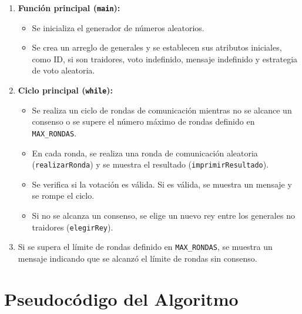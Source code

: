\documentclass[a4paper,12pt]{article}
\begin{document}
\begin{enumerate}
  \item \textbf{Función principal (\texttt{main}):}
  \begin{itemize}
      \item Se inicializa el generador de números aleatorios.
      \item Se crea un arreglo de generales y se establecen sus atributos iniciales, como ID, si son traidores, voto indefinido, mensaje indefinido y estrategia de voto aleatoria.
  \end{itemize}
  
  \item \textbf{Ciclo principal (\texttt{while}):}
  \begin{itemize}
      \item Se realiza un ciclo de rondas de comunicación mientras no se alcance un consenso o se supere el número máximo de rondas definido en \texttt{MAX\_RONDAS}.
      \item En cada ronda, se realiza una ronda de comunicación aleatoria (\texttt{realizarRonda}) y se muestra el resultado (\texttt{imprimirResultado}).
      \item Se verifica si la votación es válida. Si es válida, se muestra un mensaje y se rompe el ciclo.
      \item Si no se alcanza un consenso, se elige un nuevo rey entre los generales no traidores (\texttt{elegirRey}).
  \end{itemize}
  
  \item Si se supera el límite de rondas definido en \texttt{MAX\_RONDAS}, se muestra un mensaje indicando que se alcanzó el límite de rondas sin consenso.
\end{enumerate}








\section*{Pseudocódigo del Algoritmo}
\end{document}
